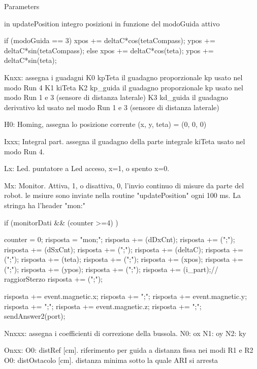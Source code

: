 \begin{DoxyParams}{Parameters}
\begin{DoxyVerb}
        in updatePosition integro posizioni in funzione del modoGuida attivo

        if (modoGuida == 3) {                   
            xpos    +=  deltaC*cos(tetaCompass);                    
            ypos    +=  deltaC*sin(tetaCompass);                    
        }
        else{                   
            xpos    +=  deltaC*cos(teta);                   
            ypos    +=  deltaC*sin(teta);                   
        }

Knxx:   assegna i guadagni
        K0 kpTeta   il guadagno proporzionale kp usato nel modo Run 4
        K1 kiTeta
        K2 kp_guida il guadagno proporzionale kp usato nel modo Run 1 e 3 (sensore di distanza laterale)
        K3 kd_guida il guadagno derivativo    kd usato nel modo Run 1 e 3 (sensore di distanza laterale)

H0:     Homing, assegna lo posizione corrente (x, y, teta) = (0, 0, 0) 

Ixxx;   Integral part. assegna il guadagno della parte integrale kiTeta usato nel modo Run 4.

Lx:     Led. puntatore a Led acceso, x=1, o spento x=0.

Mx:     Monitor. Attiva, 1, o disattiva, 0, l'invio continuo di misure da parte del robot.
        le msiure sono inviate nella routine "updatePosition" ogni 100 ms.
        La stringa ha l'header "mon:"

        if (monitorDati && (counter >=4) ){
        counter = 0;
        risposta  = "mon;";
        risposta += (dDxCnt);
        risposta += (";");
        risposta += (dSxCnt);
        risposta += (";");
        risposta += (deltaC);
        risposta += (";");
        risposta += (teta);
        risposta += (";");
        risposta += (xpos);
        risposta += (";");
        risposta += (ypos);
        risposta += (";");
        risposta += (i_part);// raggiorSterzo
        risposta += (";");

        risposta += event.magnetic.x;
        risposta += ";";
        risposta += event.magnetic.y;
        risposta += ";";
        risposta += event.magnetic.z;
        risposta += ";";
        sendAnswer2(port);
    }

Nnxxx:  assegna i coefficienti di correzione della bussola.
        N0: ox          
        N1: oy          
        N2: ky

Onxx:   
        O0: distRef      [cm]. riferimento per guida a distanza fissa nei modi R1 e R2
        O0: distOstacolo [cm]. distanza minima sotto la quale ARI si arresta


\end{DoxyVerb}
\end{DoxyParams}
